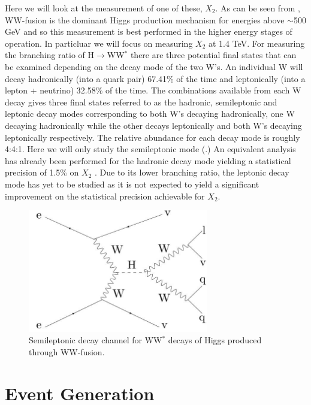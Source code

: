 Here we will look at the measurement of one of these, $X_2$. As can be seen from , WW-fusion is the dominant Higgs production mechanism for energies above $\sim $500 GeV and so this measurement is best performed in the higher energy stages of operation. In particluar we will focus on measuring $X_2$ at 1.4 TeV. For measuring the branching ratio of H$\rightarrow$WW$^*$ there are three potential final states that can be examined depending on the decay mode of the two W's. An individual W will decay hadronically (into a quark pair) 67.41\% of the time and leptonically (into a lepton + neutrino) 32.58\% of the time.  The combinations available from each W decay gives three final states referred to as the hadronic, semileptonic and leptonic decay modes corresponding to both W's decaying hadronically, one W decaying hadronically while the other decays leptonically and both W's decaying leptonically respectively. The relative abundance for each decay mode is roughly 4:4:1. Here we will only study the semileptonic mode (.) An equivalent analysis has already been performed for the hadronic decay mode yielding a statistical precision of 1.5\% on $X_2$ \cite{Abramowicz:2016zbo}. Due to its lower branching ratio, the leptonic decay mode has yet to be studied as it is not expected to yield a significant improvement on the statistical precision achievable for $X_2$. 

\begin{figure}
  \centering
  \includegraphics[width=0.7\textwidth,keepaspectratio]{Experiments/fig/feynmann}
  \caption[Semileptonic decay channel for  WW$^*$ decays of Higgs produced through WW-fusion]{Semileptonic decay channel for  WW$^*$ decays of Higgs produced through WW-fusion.}
  \label{fig:semileptonic}
\end{figure}

\section{Event Generation}


